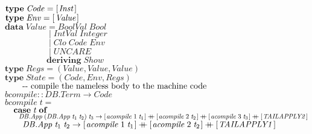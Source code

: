 \documentclass[10pt]{article}
\newcommand{\Conid}[1]{\mathit{#1}}
\newcommand{\Varid}[1]{\mathit{#1}}
\newcommand{\plus}{\mathbin{+\!\!\!+}}
\begin{document}
\begin{hscode}
${\mathbf{type}\;\Conid{Code}\mathrel{=}[\mskip1.5mu \Conid{Inst}\mskip1.5mu]}$\\
${}$\\
${\mathbf{type}\;\Conid{Env}\mathrel{=}[\mskip1.5mu \Conid{Value}\mskip1.5mu]}$\\
${}$\\
${\mathbf{data}\;\Conid{Value}\mathrel{=}\Conid{BoolVal}\;\Conid{Bool}}$\\
${\phantom{\mathbf{data}\;\Conid{Value}\mbox{}}\mid \Conid{IntVal}\;\Conid{Integer}}$\\
${\phantom{\mathbf{data}\;\Conid{Value}\mbox{}}\mid \Conid{Clo}\;\Conid{Code}\;\Conid{Env}}$\\
${\phantom{\mathbf{data}\;\Conid{Value}\mbox{}}\mid \Conid{UNCARE}}$\\
${\phantom{\mathbf{data}\;\Conid{Value}\mbox{}}\mathbf{deriving}\;\Conid{Show}}$\\
${}$\\
${\mathbf{type}\;\Conid{Regs}\mathrel{=}(\Conid{Value},\Conid{Value},\Conid{Value})}$\\
${}$\\
${\mathbf{type}\;\Conid{State}\mathrel{=}(\Conid{Code},\Conid{Env},\Conid{Regs})}$\\
${}$\\
${}$\\
${\mbox{\qquad-{}- compile the nameless body to the machine code}}$\\
${}$\\
${\Varid{bcompile}\mathbin{::}\Conid{\Conid{DB}.Term}\to \Conid{Code}}$\\
${\Varid{bcompile}\;\Varid{t}\mathrel{=}}$\\
${\hskip1.00em\relax\mathbf{case}\;\Varid{t}\;\mathbf{of}}$\\
${\hskip1.00em\relax\hskip1.00em\relax\Conid{\Conid{DB}.App}\;(\Conid{\Conid{DB}.App}\;\Varid{t}_{1}\;\Varid{t}_{2})\;\Varid{t}_{3}\to [\mskip1.5mu \Varid{acompile}\;\mathrm{1}\;\Varid{t}_{1}\mskip1.5mu]\plus [\mskip1.5mu \Varid{acompile}\;\mathrm{2}\;\Varid{t}_{2}\mskip1.5mu]\plus [\mskip1.5mu \Varid{acompile}\;\mathrm{3}\;\Varid{t}_{3}\mskip1.5mu]\plus [\mskip1.5mu \Conid{TAILAPPLY2}\mskip1.5mu]}$\\
${\hskip1.00em\relax\hskip1.00em\relax\Conid{\Conid{DB}.App}\;\Varid{t}_{1}\;\Varid{t}_{2}\to [\mskip1.5mu \Varid{acompile}\;\mathrm{1}\;\Varid{t}_{1}\mskip1.5mu]\plus [\mskip1.5mu \Varid{acompile}\;\mathrm{2}\;\Varid{t}_{2}\mskip1.5mu]\plus [\mskip1.5mu \Conid{TAILAPPLY1}\mskip1.5mu]}$\\

\end{hscode}
\end{document}
